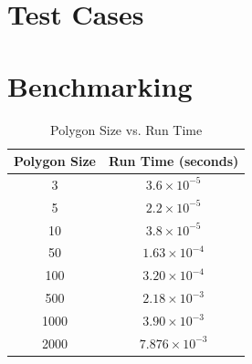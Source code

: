 \documentclass{labReport}
\begin{document}
\begin{multicols*}{2}
\section{Test Cases}



\section{Benchmarking}
\begin{table}[H]
\centering
\begin{tabular}{|c|c|}
\hline
\textbf{Polygon Size} & \textbf{Run Time (seconds)} \\ \hline
3    & \(3.6 \times 10^{-5}\) \\ \hline
5    & \(2.2 \times 10^{-5}\) \\ \hline
10   & \(3.8 \times 10^{-5}\) \\ \hline
50   & \(1.63 \times 10^{-4}\) \\ \hline
100  & \(3.20 \times 10^{-4}\) \\ \hline
500  & \(2.18 \times 10^{-3}\) \\ \hline
1000 & \(3.90 \times 10^{-3}\) \\ \hline
2000 & \(7.876 \times 10^{-3}\) \\ \hline
\end{tabular}
\caption{Polygon Size vs. Run Time}
\label{tab:runtime}
\end{table}



\end{multicols*}

\end{document}
